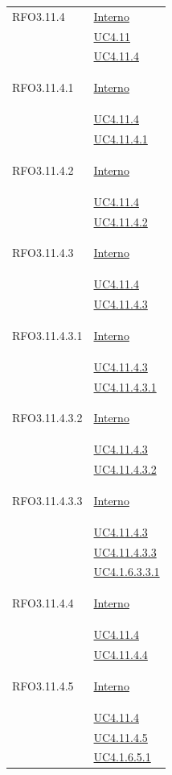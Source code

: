 \begin{longtable}{|>{\centering}m{5cm}|m{5cm}<{\centering}|}
\hypertarget{RFO3.11.4}{RFO3.11.4} & \hyperlink{Interno}{Interno}\\
&\hyperref[UC4.11]{UC4.11}\\
&\hyperref[UC4.11.4]{UC4.11.4}\\ \hline

\hypertarget{RFO3.11.4.1}{RFO3.11.4.1} & \hyperlink{Interno}{Interno}\\
&\hyperref[UC4.11.4]{UC4.11.4}\\
&\hyperref[UC4.11.4.1]{UC4.11.4.1}\\ \hline

\hypertarget{RFO3.11.4.2}{RFO3.11.4.2} & \hyperlink{Interno}{Interno}\\
&\hyperref[UC4.11.4]{UC4.11.4}\\
&\hyperref[UC4.11.4.2]{UC4.11.4.2}\\ \hline

\hypertarget{RFO3.11.4.3}{RFO3.11.4.3} & \hyperlink{Interno}{Interno}\\
&\hyperref[UC4.11.4]{UC4.11.4}\\
&\hyperref[UC4.11.4.3]{UC4.11.4.3}\\ \hline

\hypertarget{RFO3.11.4.3.1}{RFO3.11.4.3.1} & \hyperlink{Interno}{Interno}\\
& \hyperref[UC4.11.4.3]{UC4.11.4.3}\\
& \hyperref[UC4.11.4.3.1]{UC4.11.4.3.1}\\ \hline

\hypertarget{RFO3.11.4.3.2}{RFO3.11.4.3.2} & \hyperlink{Interno}{Interno}\\
& \hyperref[UC4.11.4.3]{UC4.11.4.3}\\
& \hyperref[UC4.11.4.3.2]{UC4.11.4.3.2}\\ \hline

\hypertarget{RFO3.11.4.3.3}{RFO3.11.4.3.3} & \hyperlink{Interno}{Interno}\\
& \hyperref[UC4.11.4.3]{UC4.11.4.3}\\
&\hyperref[UC4.11.4.3.3]{UC4.11.4.3.3}\\
&\hyperref[UC4.1.6.3.3.1]{UC4.1.6.3.3.1}\\ \hline

\hypertarget{RFO3.11.4.4}{RFO3.11.4.4} & \hyperlink{Interno}{Interno}\\
&\hyperref[UC4.11.4]{UC4.11.4}\\
&\hyperref[UC4.11.4.4]{UC4.11.4.4}\\ \hline

\hypertarget{RFO3.11.4.5}{RFO3.11.4.5} & \hyperlink{Interno}{Interno}\\
&\hyperref[UC4.11.4]{UC4.11.4}\\
&\hyperref[UC4.11.4.5]{UC4.11.4.5}\\
&\hyperref[UC4.1.6.5.1]{UC4.1.6.5.1}\\ \hline


\end{longtable}
